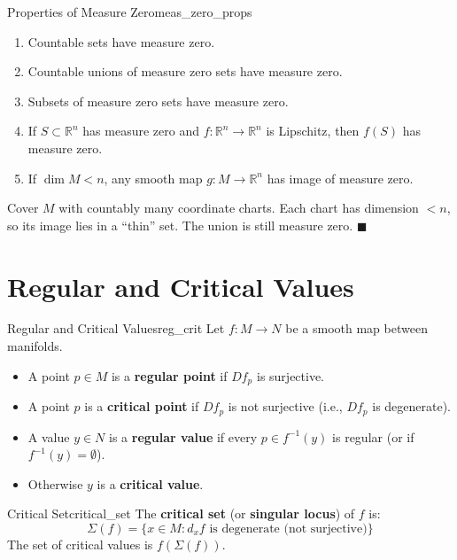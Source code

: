 \documentclass[11pt, letterpaper, openany]{book}
\renewenvironment{proof}[1][\proofname]{%
  \tcolorbox[blanker, breakable, left=1em,
    before skip=1em, after skip=1em,
    borderline west={2pt}{0pt}{MagicTeal!50},
    colback=MagicCream,
    before upper={\textcolor{MagicTeal}{\sffamily\bfseries #1.}\space}
  ]%
}{%
  \hfill\textcolor{MagicTeal}{\ensuremath{\blacksquare}}\endtcolorbox%
}
\begin{document}
\begin{thm}{Properties of Measure Zero}{meas_zero_props}
\begin{enumerate}
    \item Countable sets have measure zero.
    \item Countable unions of measure zero sets have measure zero.
    \item Subsets of measure zero sets have measure zero.
    \item If $S \subset \mathbb{R}^n$ has measure zero and $f: \mathbb{R}^n \to \mathbb{R}^n$ is Lipschitz, then $f(S)$ has measure zero.
    \item If $\dim M < n$, any smooth map $g: M \to \mathbb{R}^n$ has image of measure zero.
\end{enumerate}
\end{thm}

\begin{proof}[Sketch of (5)]
Cover $M$ with countably many coordinate charts. Each chart has dimension $< n$, so its image lies in a ``thin'' set. The union is still measure zero.
\end{proof}

\section{Regular and Critical Values}

\begin{defn}{Regular and Critical Values}{reg_crit}
Let $f: M \to N$ be a smooth map between manifolds.
\begin{itemize}
    \item A point $p \in M$ is a \textbf{regular point} if $Df_p$ is surjective.
    \item A point $p$ is a \textbf{critical point} if $Df_p$ is not surjective (i.e., $Df_p$ is degenerate).
    \item A value $y \in N$ is a \textbf{regular value} if every $p \in f^{-1}(y)$ is regular (or if $f^{-1}(y) = \emptyset$).
    \item Otherwise $y$ is a \textbf{critical value}.
\end{itemize}
\end{defn}

\begin{defn}{Critical Set}{critical_set}
The \textbf{critical set} (or \textbf{singular locus}) of $f$ is:
\[\Sigma(f) = \{x \in M : d_x f \text{ is degenerate (not surjective)}\}\]
The set of critical values is $f(\Sigma(f))$.
\end{defn}
\end{document}
